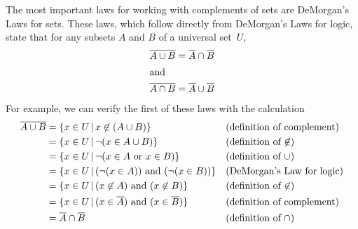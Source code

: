 The most important laws for working with complements of sets
are DeMorgan's Laws for sets.  These
laws, which follow directly from DeMorgan's Laws for logic, state
that for any subsets $A$ and $B$ of a universal set~$U$,
\begin{align*}
\overline{A\cup B}&=\overline{A}\cap\overline{B}\\
\intertext{and}
\overline{A\cap B}&=\overline{A}\cup\overline{B}
\end{align*}
For example, we can verify the first of these laws with the calculation
\begin{align*}
\overline{A\cup B}&= \{x\in U\,|\, x \not\in (A\cup B)\}
                       &&\text{(definition of complement)}\\
                  &= \{x\in U\,|\, \lnot( x\in A\cup B)\}
                       &&\text{(definition of $\not\in$)}\\
                  &= \{x\in U\,|\, \lnot(x\in A \text{ or } x\in B)\}
                       &&\text{(definition of $\cup$)}\\
                  &= \{x\in U\,|\, (\lnot(x\in A))\text{ and }(\lnot(x\in B))\}
                       &&\text{(DeMorgan's Law for logic)}\\
                  &= \{x\in U\,|\, (x\not\in A) \text{ and } (x\not\in B)\}
                       &&\text{(definition of $\not\in$)}\\
                  &= \{x\in U\,|\, (x\in\overline{A}) \text{ and } (x\in\overline{B})\}
                       &&\text{(definition of complement)}\\
                  &= \overline{A}\cap\overline{B}
                       &&\text{(definition of $\cap$)}
\end{align*}


